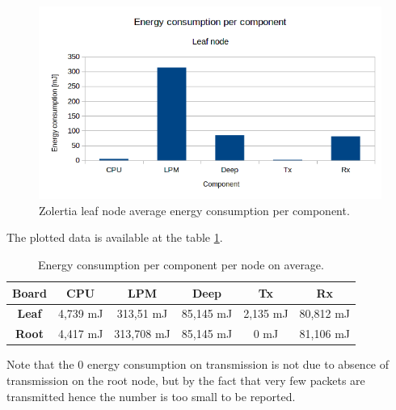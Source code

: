 \documentclass[conference]{IEEEtran}
\begin{document}
\begin{figure}[htbp]
	\centering
	\includegraphics[width=.5\textwidth,keepaspectratio]{LeafConsumptionComponent.png}
	\caption{Zolertia leaf node average energy consumption per component.}
	\label{fig:LeafConsumptionComponent}
\end{figure}
The plotted data is available at the table \ref{tab:nodeEnergyComparison2}.
\begin{table}[H]
	\begin{center}
		\begin{tabular}{cccccc}
			\hline
			\textbf{Board} & \textbf{CPU} & \textbf{LPM} & \textbf{Deep} & \textbf{Tx} & \textbf{Rx} \\ \hline
			\textbf{Leaf}  & 4,739 mJ       & 313,51 mJ      & 85,145 mJ       & 2,135 mJ      & 80,812 mJ     \\
			\textbf{Root}  & 4,417 mJ       & 313,708 mJ     & 85,145 mJ       & 0 mJ          & 81,106 mJ     \\ \hline
		\end{tabular}
	\end{center}
	\caption{Energy consumption per component per node on average.}
	\label{tab:nodeEnergyComparison2}
\end{table}
Note that the 0 energy consumption on transmission is not due to absence of transmission on the root node, but by the fact that very few packets are transmitted hence the number is too small to be reported.
\end{document}
